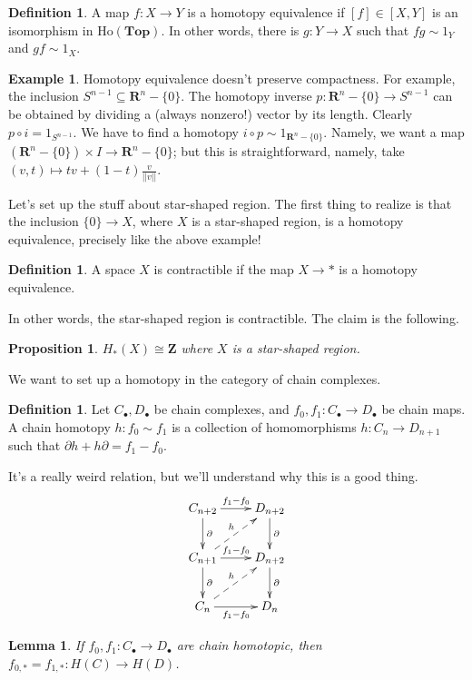 \documentclass{amsart}
\theoremstyle{theorem}
\newtheorem{prop}[theorem]{Proposition}
\newtheorem{lemma}[theorem]{Lemma}
\theoremstyle{definition}
\newtheorem{definition}[theorem]{Definition}
\newtheorem{example}[theorem]{Example}
\newcommand{\htop}{\mathrm{Ho}(\mathbf{Top})}
\begin{document}
\begin{definition}
A map $f:X\to Y$ is a homotopy equivalence if $[f]\in[X,Y]$ is an isomorphism in $\htop$. In other words, there is $g:Y\to X$ such that $fg\sim 1_Y$ and $gf\sim 1_X$.
\end{definition}
\begin{example}
Homotopy equivalence doesn't preserve compactness. For example, the inclusion $S^{n-1}\subseteq \mathbf{R}^n-\{0\}$. The homotopy inverse $p:\mathbf{R}^n-\{0\}\to S^{n-1}$ can be obtained by dividing a (always nonzero!) vector by its length. Clearly $p\circ i=1_{S^{n-1}}$. We have to find a homotopy $i\circ p\sim 1_{\mathbf{R}^n-\{0\}}$. Namely, we want a map $(\mathbf{R}^n-\{0\})\times I\to \mathbf{R}^n-\{0\}$; but this is straightforward, namely, take $(v,t)\mapsto tv+(1-t)\frac{v}{||v||}$.
\end{example}
Let's set up the stuff about star-shaped region. The first thing to realize is that the inclusion $\{0\}\to X$, where $X$ is a star-shaped region, is a homotopy equivalence, precisely like the above example!
\begin{definition}
A space $X$ is contractible if the map $X\to\ast$ is a homotopy equivalence.
\end{definition}
In other words, the star-shaped region is contractible. The claim is the following.
\begin{prop}
$ H_\ast(X)\cong\mathbf{Z}$ where $X$ is a star-shaped region.
\end{prop}
We want to set up a homotopy in the category of chain complexes.
	\begin{definition}
	Let $C_\bullet,D_\bullet$ be chain complexes, and $f_0,f_1:C_\bullet\to D_\bullet$ be chain maps. A chain homotopy $h:f_0\sim f_1$ is a collection of homomorphisms $h:C_n\to D_{n+1}$ such that $\partial h+h\partial=f_1-f_0$.
	\end{definition}
It's a really weird relation, but we'll understand why this is a good thing.
			\begin{equation*}
			\xymatrix{C_{n+2}\ar[r]^{f_1-f_0}\ar[d]^\partial & D_{n+2}\ar[d]^\partial\\
			C_{n+1}\ar@{-->}[ur]^h\ar[r]^{f_1-f_0}\ar[d]^\partial & D_{n+2}\ar[d]^\partial\\
			C_n\ar@{-->}[ur]^h\ar[r]_{f_1-f_0} & D_n}
			\end{equation*}
	\begin{lemma}
	If $f_0,f_1:C_\bullet\to D_\bullet$ are chain homotopic, then $f_{0,\ast}=f_{1,\ast}: H(C)\to H(D)$.
	\end{lemma}
\end{document}
